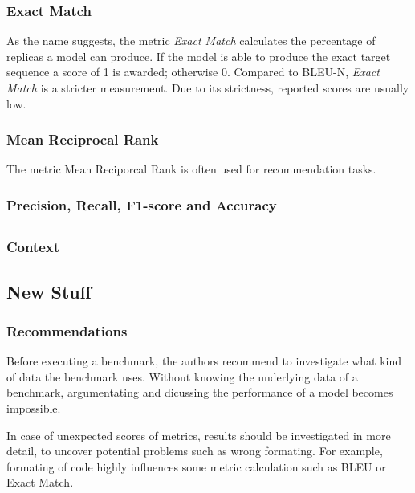 \documentclass[11pt]{article}
\begin{document}
\subsubsection{Exact Match}

As the name suggests, the metric \emph{Exact Match} calculates the percentage of replicas a model can produce.
If the model is able to produce the exact target sequence a score of 1 is awarded; otherwise 0.
Compared to BLEU-N, \emph{Exact Match} is a stricter measurement.
Due to its strictness, reported scores are usually low.

\subsubsection{Mean Reciprocal Rank}

The metric Mean Reciporcal Rank is often used for recommendation tasks.
\todo{}

\subsubsection{Precision, Recall, F1-score and Accuracy}
\todo{}

\subsection{}
\subsubsection{Context}
\subsection{New Stuff}

\subsubsection{Recommendations}

Before executing a benchmark, the authors recommend to investigate what kind of data the benchmark uses.
Without knowing the underlying data of a benchmark, argumentating and dicussing the performance of a model becomes impossible.

In case of unexpected scores of metrics, results should be investigated in more detail, to uncover potential problems such as wrong formating.
For example, formating of code highly influences some metric calculation such as BLEU or Exact Match.
\end{document}

